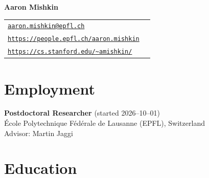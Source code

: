 \documentclass[11pt, a4paper]{article}
\makeatletter
\gdef\tshortstack{\@ifnextchar[\@tshortstack{\@tshortstack[c]}}
\gdef\@tshortstack[#1]{%
  \leavevmode
  \vtop\bgroup
    \baselineskip-\p@\lineskip 3\p@
    \let\mb@l\hss\let\mb@r\hss
    \expandafter\let\csname mb@#1\endcsname\relax
    \let\\\@stackcr
    \@ishortstack}
\newcommand{\mitem}[1]{\item[\smash{\tshortstack[l]{#1}}]}
\newcommand{\mleftsize}{4.75em}
\makeatother
\begin{document}
\thispagestyle{empty}

\titlespacing*{\section}{0pt}{2.0ex}{2.0ex}
\titlespacing*{\subsection}{0pt}{2.0ex}{2.0ex}

\begin{minipage}[c]{0.3\linewidth}
    {\Large\textbf{Aaron Mishkin}}
    \vspace{3ex}
\end{minipage}%
\hfill%
\begin{minipage}[c]{0.6\linewidth}
    \hfill
    \begin{tabular}{ll}
        \href{mailto:aaron.mishkin@epfl.ch}{\texttt{aaron.mishkin@epfl.ch}}                        \\[-.25em]
        \href{https://people.epfl.ch/aaron.mishkin}{\texttt{https://people.epfl.ch/aaron.mishkin}} \\[-.25em]
        \href{https://cs.stanford.edu/~amishkin/}{\texttt{https://cs.stanford.edu/{\textasciitilde}amishkin/}}
    \end{tabular}
\end{minipage}

\vspace{-1ex}
\section{Employment}

\begin{description}[leftmargin=\mleftsize,style=nextline,font=\normalfont\space]
    \mitem{2026 --
   \\[.25em] Current }
    \textbf{Postdoctoral Researcher} \hfill (started 2026--10--01)\\
    École Polytechnique Fédérale de Lausanne (EPFL), Switzerland\\
    Advisor: Martin Jaggi
\end{description}

\section{Education}
\end{document}
